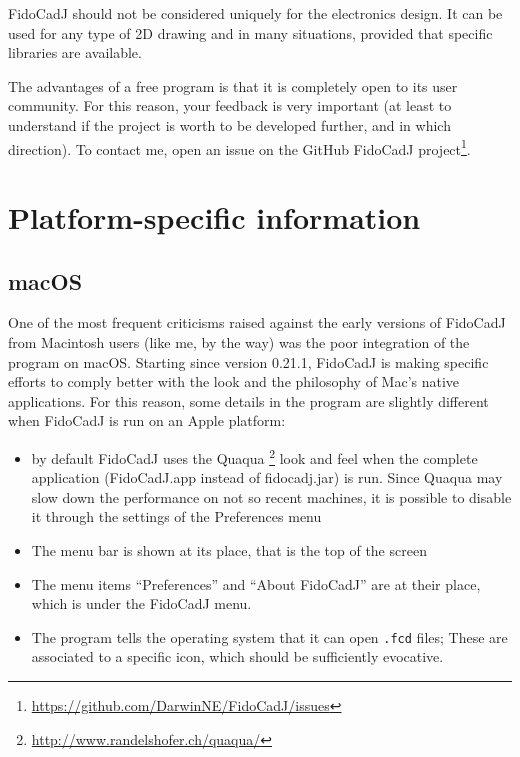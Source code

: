 \documentclass[10pt,a4paper,twoside]{scrreprt}
\begin{document}
FidoCadJ should not be considered uniquely for the
electronics design. It can be used for any type of 2D drawing and
in many situations, provided that specific libraries are available.

The advantages of a free program is that it is completely open
to its user community. For this reason, your feedback is very
important (at least to understand if the project is worth to be developed
further, and in which direction). To contact me, open an issue on the GitHub FidoCadJ  project\footnote{\href{https://github.com/DarwinNE/FidoCadJ/issues}{https://github.com/DarwinNE/FidoCadJ/issues}}.

\appendix

\chapter{Platform-specific information} \label{specifics}


\section{macOS}

One of the most frequent criticisms raised against the early versions
of FidoCadJ from Macintosh users (like me, by the way) was the poor
integration of the program on macOS. Starting since version 0.21.1,
FidoCadJ is making specific efforts to comply better with the look
and the philosophy of Mac's native applications. For this reason,
some details in the program are slightly different when FidoCadJ is
run on an Apple platform:
\begin{itemize}
\item by default FidoCadJ uses the Quaqua%
\footnote{\href{http://www.randelshofer.ch/quaqua/}{http://www.randelshofer.ch/quaqua/}%
} look and feel when the complete application (FidoCadJ.app
instead of fidocadj.jar) is run. Since Quaqua
may slow down the performance on not so recent machines, it is possible
to disable it through the settings of the Preferences menu
\item The menu bar is shown at its place, that is the top of the screen
\item The menu items ``Preferences'' and ``About FidoCadJ'' are
at their place, which is under the FidoCadJ menu.
\item The program tells the operating system that it can open \lstinline!.fcd!
files; These are associated to a specific icon, which should be sufficiently
evocative.
\end{itemize}
\end{document}
